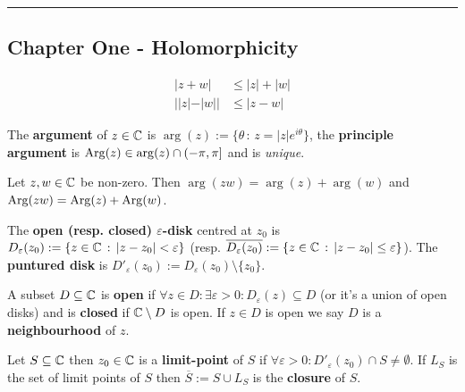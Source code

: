 \vspace{-6ex}
\noindent\rule{\linewidth}{0.5pt}\vspace{-2ex}
\begin{multicols}{2}
\section*{Chapter One - Holomorphicity}

\begin{theorem}
    \begin{align*}
    |z+w| &\leq |z| + |w| \\
    ||z|-|w|| &\leq |z-w|
    \end{align*}
\end{theorem}

\begin{definition}
The \textbf{argument} of $z\in\mathbb{C}$ is $\arg(z):=\{\theta\,:\,z=|z|e^{i\theta}\}$, the \textbf{principle argument} is $\mathrm{Arg}(z)\in\arg(z)\cap(-\pi,\pi]$ and is \textit{unique}. 
\end{definition}

\begin{theorem}[1.1.19]
Let $z,w\in\mathbb{C}$ be non-zero. Then $\arg(zw)=\arg(z)+\arg(w)$ and $\mathrm{Arg}(zw)=\mathrm{Arg}(z)+\mathrm{Arg}(w)$.
\end{theorem}

\begin{definition}
The \textbf{open (resp. closed) $\varepsilon$-disk} centred at $z_0$ is $D_\varepsilon(z_0):=\{z\in\mathbb{C}\,:\,|z-z_0|<\varepsilon\}$ (resp. $\overline{D_\varepsilon(z_0)}:=\{z\in\mathbb{C}\,:\,|z-z_0|\leq\varepsilon\}$). The \textbf{puntured disk} is $D'_\varepsilon(z_0):=D_\varepsilon(z_0)\setminus\{z_0\}$.
\end{definition}

\begin{definition}
A subset $D\subseteq\mathbb{C}$ is \textbf{open} if $\forall z\in D:\exists\varepsilon>0:D_\varepsilon(z)\subseteq D$ (or it's a union of open disks) and is \textbf{closed} if $\mathbb{C}\setminus D$ is open. If $z\in D$ is open we say $D$ is a \textbf{neighbourhood} of $z$.
\end{definition}

\begin{definition}
Let $S\subseteq\mathbb{C}$ then $z_0\in\mathbb{C}$ is a \textbf{limit-point} of $S$ if $\forall\varepsilon>0: D'_\varepsilon(z_0)\cap S\neq\emptyset$. If $L_S$ is the set of limit points of $S$ then $\overline{S}:=S\cup L_S$ is the \textbf{closure} of $S$.
\end{definition}


\end{multicols}

